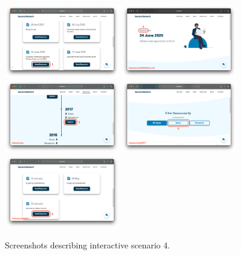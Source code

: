 \documentclass[12pt]{report}
\begin{document}
\begin{figure}[H]
	\centering
	\includegraphics[width=0.45\textwidth]{scenarios/4/1.png}
	\includegraphics[width=0.45\textwidth]{scenarios/4/2.png}
	\includegraphics[width=0.45\textwidth]{scenarios/4/3.png}
	\includegraphics[width=0.45\textwidth]{scenarios/4/4.png}
	\includegraphics[width=0.45\textwidth]{scenarios/4/5.png}
	\caption{Screenshots describing interactive scenario 4.}
\end{figure}
\end{document}
